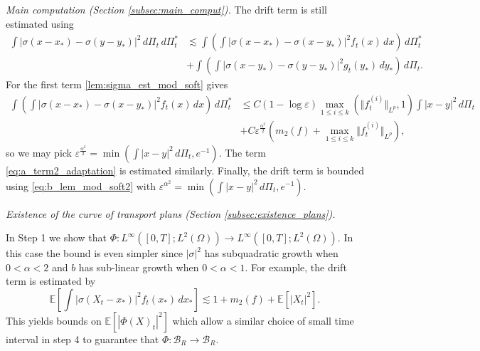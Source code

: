 \documentclass[10pt,oneside]{amsart}
\numberwithin{equation}{section}
\numberwithin{definition}{section}
\numberwithin{theorem}{section}
\numberwithin{lemma}{section}
\begin{document}
\textit{Main computation (Section \ref{subsec:main_comput}).} The drift term is still estimated using
%
\begin{align}
  \int\left|\sigma(x-x_{*})-\sigma(y-y_{*})\right|^{2}\,d\Pi_{t}\,d\Pi_{t}^{*}&\nonumber
  \lesssim\int\left(\int\left|\sigma(x-x_{*})-\sigma(x-y_{*})\right|^{2}f_{t}(x)\,dx\right)\,d\Pi_{t}^{*}\\
  &+\int\left(\int\left|\sigma(x-y_{*})-\sigma(y-y_{*})\right|^{2}g_{t}(y_{*})\,dy_{*}\right)\,d\Pi_t.\label{eq:a_term2_adaptation}
\end{align}
%
For the first term  \cref{lem:sigma_est_mod_soft} gives
%
\begin{align*}
  \int\left(\int\left|\sigma(x-x_{*})-\sigma(x-y_{*})\right|^{2}f_{t}(x)\,dx\right)\,d\Pi_{t}^{*}&
  \leq C(1-\log\varepsilon)\max_{1\leq i\leq k}(\Vert f_{t}^{(i)}\Vert_{L^{p}},1)\int|x-y|^{2}\,d\Pi_{t}	\\
  &+C\varepsilon^{\frac{\alpha^{2}}{2}}\left(m_{2}(f)+\max_{1\leq i\leq k}\Vert f_{t}^{(i)}\Vert_{L^{p}}\right),
\end{align*}
%
so we may pick ${\displaystyle \varepsilon^{\frac{\alpha^{2}}{2}}=\min\left(\int|x-y|^{2}\,d\Pi_t,e^{-1}\right)}$. The term \cref{eq:a_term2_adaptation} is estimated similarly. Finally, the drift term is bounded using \cref{eq:b_lem_mod_soft2} with ${\displaystyle \varepsilon^{\alpha^{2}}=\min\left(\int|x-y|^{2}\,d\Pi_t,e^{-1}\right)}$.

\textit{Existence of the curve of transport plans (Section \ref{subsec:existence_plans}).}

In Step 1 we show that $\Phi:L^{\infty}\left([0,T];L^{2}(\Omega)\right)\longrightarrow L^{\infty}\left([0,T];L^{2}(\Omega)\right)$. In this case the bound is even simpler since $|\sigma|^2$ has subquadratic growth when $0<\alpha <2$ and $b$ has sub-linear growth when $0<\alpha <1$. For example, the drift term is estimated by
%
\begin{equation*}
  \mathbb{E}\left[\int\left|\sigma(X_{t}-x_{*})\right|^{2}f_{t}(x_{*})\,dx_{*}\right]
  \lesssim1+m_{2}(f)+\mathbb{E}\left[|X_{t}|^{2}\right].
\end{equation*}
% 
This yields bounds on $\mathbb{E}\left[|\Phi(X)_{t}|^{2}\right]$ which allow a similar choice of small time interval in step 4 to guarantee that $\Phi:\mathcal{B}_{R}\longrightarrow\mathcal{B}_{R}$.
\end{document}

